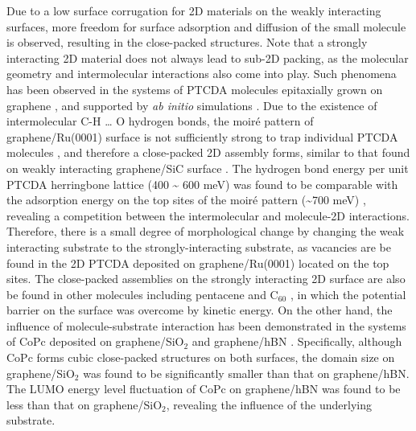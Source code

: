 Due to a low surface corrugation for 2D materials on the weakly
interacting surfaces, more freedom for surface adsorption and
diffusion of the small molecule is observed, resulting in the
close-packed structures. Note that a strongly interacting 2D material
does not always lead to sub-2D packing, as the molecular geometry and
intermolecular interactions also come into play. Such phenomena has
been observed in the systems of PTCDA molecules epitaxially grown on
graphene
\cite{Wang_2009_STM_PTCDA_Gr,Lauffer_2008_PTCDA_gr_sic,Emery_2011_PTCDA_gr,Tian_2010_PTCDA_gr},
and supported by \emph{ab initio} simulations
\cite{Mura_2010_DFT_H_bond_PTCDA_gr}. Due to the existence of
intermolecular C-H \dots{} O hydrogen bonds, the moiré pattern of
graphene/Ru(0001) surface is not sufficiently strong to trap
individual PTCDA molecules \cite{Wang_2009_STM_PTCDA_Gr}, and therefore
a close-packed 2D assembly forms, similar to that found on weakly
interacting graphene/SiC surface
\cite{Lauffer_2008_PTCDA_gr_sic,Emery_2011_PTCDA_gr}. The hydrogen bond
energy per unit PTCDA herringbone lattice (400 \textasciitilde{} 600 meV)
\cite{Tian_2010_PTCDA_gr} was found to be comparable with the adsorption
energy on the top sites of the moiré pattern (\textasciitilde{}700 meV)
\cite{Roos_2011_BTP_gr}, revealing a competition between the
intermolecular and molecule-2D interactions. Therefore, there is a
small degree of morphological change by changing the weak interacting
substrate to the strongly-interacting substrate, as vacancies are be
found in the 2D PTCDA deposited on graphene/Ru(0001) located on the
top sites. The close-packed assemblies on the strongly interacting 2D
surface are also be found in other molecules including pentacene
\cite{Zhou_2013_pent_gr_Ru} and C\(_{\text{60}}\)
\cite{Lu_2012_c60_gr_moire,Li_2012_c60_gr_Ru}, in which the potential
barrier on the surface was overcome by kinetic energy. On the other
hand, the influence of molecule-substrate interaction has been
demonstrated in the systems of CoPc deposited on graphene/SiO\(_{\text{2}}\) and
graphene/hBN \cite{Jarvinen_2013_assembl_SiO2_hBN}. Specifically,
although CoPc forms cubic close-packed structures on both surfaces,
the domain size on graphene/SiO\(_{\text{2}}\) was found to be significantly
smaller than that on graphene/hBN. The LUMO energy level fluctuation
of CoPc on graphene/hBN was found to be less than that on
graphene/SiO\(_{\text{2}}\), revealing the influence of the underlying substrate.

